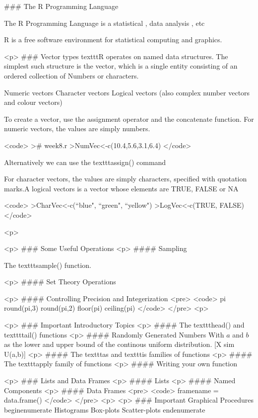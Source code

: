 
### {The R Programming Language}

The R Programming Language is a statistical , data analysis , etc

R is a free software environment for statistical computing and graphics.



<p>
### {Vector types}
texttt{R} operates on named data structures. The simplest such structure is the
vector, which is a single entity consisting of an ordered collection of
Numbers or characters.


Numeric vectors
Character vectors
Logical vectors
(also complex number vectors and colour vectors)


To create a vector, use the assignment operator and the concatenate function.
For numeric vectors, the values are simply numbers.

<code>
># week8.r
>NumVec<-c(10.4,5.6,3.1,6.4)
</code>

Alternatively we can use the texttt{assign()} command

For character vectors, the values are simply characters, specified with
quotation marks.A logical vectors is a vector whose elements are TRUE, FALSE or NA

<code>
>CharVec<-c(``blue", ``green", ``yellow")
>LogVec<-c(TRUE, FALSE)
</code>

<p>






<p>
### {Some Useful Operations}
<p>
#### {Sampling}

The texttt{sample()} function.

<p>
#### {Set Theory Operations}

<p>
#### {Controlling Precision and Integerization}
<pre>
<code>
pi
round(pi,3)
round(pi,2)
floor(pi)
ceiling(pi)
</code>
</pre>
<p>


<p>
### {Important Introductory Topics}
<p>
#### {The texttt{head()} and texttt{tail()} functions}
<p>
#### {Randomly Generated Numbers}
With $a$ and $b$ as the lower and upper bound of the continous uniform distribution.
[X sim U(a,b)]
<p>
#### {The texttt{as} and texttt{is} families of functions}
<p>
#### {The texttt{apply} family of functions}
<p>
#### {Writing your own function}


<p>
### {Lists and Data Frames}
<p>
#### {Lists}
<p>
#### {Named Components}
<p>
#### {Data Frames}
<pre>
<code>
framename = data.frame()
</code>
</pre>
<p>
<p>
### {Important Graphical Procedures}
begin{enumerate}
Histograms
Box-plots
Scatter-plots
end{enumerate}


